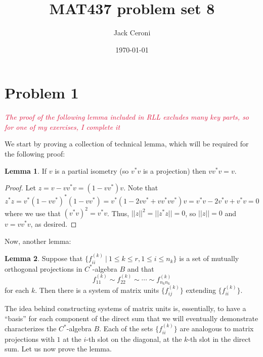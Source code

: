 \documentclass[aps,pra,showpacs,notitlepage,onecolumn,superscriptaddress,nofootinbib]{revtex4-1}
\newcommand{\pop}[1]{\textcolor{crimson}{#1}}
\theoremstyle{definition}
\newtheorem{lemma}{Lemma}[section]
\begin{document}
\title{MAT437 problem set 8}
\author{Jack Ceroni}

\date{\today}

\maketitle

\section{Problem 1}

\noindent \pop{\emph{The proof of the following lemma included in RLL excludes many key parts, so for one of my exercises, I complete it}}
\newline

\noindent We start by proving a collection of technical lemma, which will be required for the following proof:

\begin{lemma}
If $v$ is a partial isometry (so $v^{*} v$ is a projection) then $v v^{*} v = v$.
\end{lemma}
\begin{proof}
  Let $z = v - v v^{*} v = (1 - v v^{*})v$. Note that
  \begin{equation}
    z^{*} z = v^{*} (1 - v v^{*})^{*} (1 - v v^{*}) = v^{*} (1 - 2 v v^{*} +  v v^{*} v v^{*}) v = v^{*} v - 2 v^{*} v + v^{*} v = 0
  \end{equation}
  where we use that $(v^{*} v)^2 = v^{*} v$. Thus, $||z||^2 = ||z^{*} z|| = 0$, so $||z|| = 0$ and $v = v v^{*} v$, as desired.
  \end{proof}

\noindent Now, another lemma:

\begin{lemma}
  Suppose that $\{f_{ii}^{(k)} \ | \ 1 \leq k \leq r, 1 \leq i \leq n_k\}$ is a set of mutually orthogonal projections in $C^{*}$-algebra $B$ and that
  \begin{equation}
    f_{11}^{(k)} \sim f_{22}^{(k)} \sim \cdots \sim f_{n_k n_k}^{(k)}
  \end{equation}
  for each $k$. Then there is a system of matrix units $\{f_{ij}^{(k)}\}$ extending $\{f_{ii}^{(k)}\}$.
\end{lemma}

\noindent The idea behind constructing systems of matrix units is, essentially, to have a ``basis'' for each component of the direct sum
that we will eventually demonstrate characterizes the $C^{*}$-algebra $B$. Each of the sets $\{f_{ii}^{(k)}\}$ are analogous to matrix projections
with $1$ at the $i$-th slot on the diagonal, at the $k$-th slot in the direct sum. Let us now prove the lemma.
\end{document}
